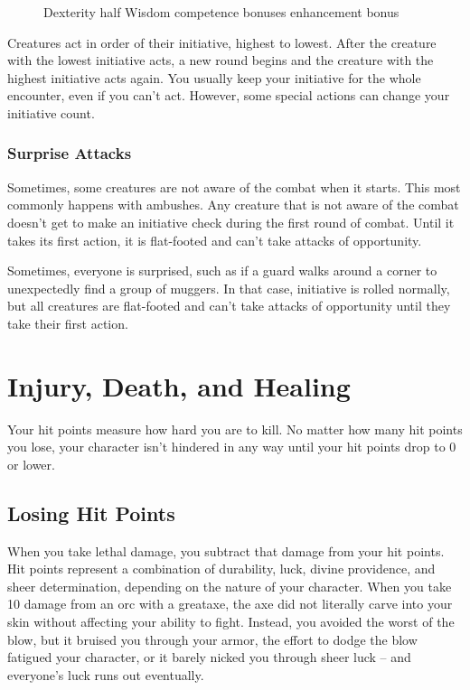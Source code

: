 \begin{figure}[h]
    \centering Dexterity \add half Wisdom \add competence bonuses \add enhancement bonus
\end{figure}

Creatures act in order of their initiative, highest to lowest. After the creature with the lowest initiative acts, a new round begins and the creature with the highest initiative acts again. You usually keep your initiative for the whole encounter, even if you can't act. However, some special actions can change your initiative count.

\subsubsection{Surprise Attacks}
Sometimes, some creatures are not aware of the combat when it starts. This most commonly happens with ambushes. Any creature that is not aware of the combat doesn't get to make an initiative check during the first round of combat. Until it takes its first action, it is flat-footed and can't take attacks of opportunity.

Sometimes, everyone is surprised, such as if a guard walks around a corner to unexpectedly find a group of muggers. In that case, initiative is rolled normally, but all creatures are flat-footed and can't take attacks of opportunity until they take their first action.

\section{Injury, Death, and Healing}
Your hit points measure how hard you are to kill. No matter how many hit points you lose, your character isn't hindered in any way until your hit points drop to 0 or lower.

\subsection{Losing Hit Points}
When you take lethal damage, you subtract that damage from your hit points.
 Hit points represent a combination of durability, luck, divine providence, and sheer determination, depending on the nature of your character. When you take 10 damage from an orc with a greataxe, the axe did not literally carve into your skin without affecting your ability to fight. Instead, you avoided the worst of the blow, but it bruised you through your armor, the effort to dodge the blow fatigued your character, or it barely nicked you through sheer luck -- and everyone's luck runs out eventually.

